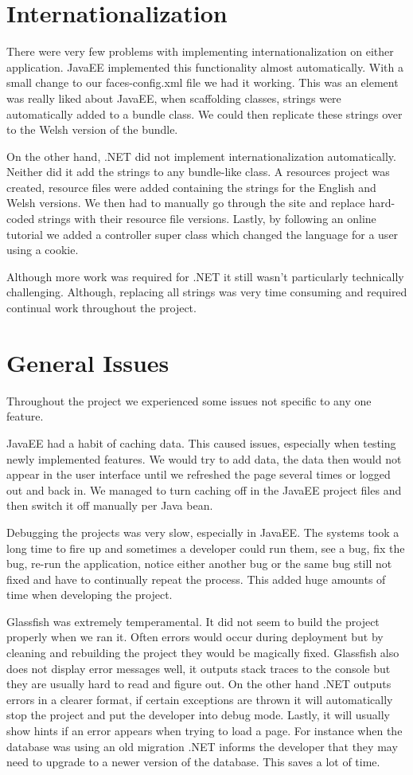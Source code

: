 \section{Internationalization}
There were very few problems with implementing internationalization on either application. JavaEE implemented this functionality almost automatically. With a small change to our faces-config.xml file we had it working. This was an element was really liked about JavaEE, when scaffolding classes, strings were automatically added to a bundle class. We could then replicate these strings over to the Welsh version of the bundle. \par
On the other hand, .NET did not implement internationalization automatically. Neither did it add the strings to any bundle-like class. A resources project was created, resource files were added containing the strings for the English and Welsh versions. We then had to manually go through the site and replace hard-coded strings with their resource file versions. Lastly, by following an online tutorial\cite{mvci18ntutorial} we added a controller super class which changed the language for a user using a cookie. \par
Although more work was required for .NET it still wasn’t particularly technically challenging. Although, replacing all strings was very time consuming and required continual work throughout the project.
\section {General Issues}
Throughout the project we experienced some issues not specific to any one feature. \par
JavaEE had a habit of caching data. This caused issues, especially when testing newly implemented features. We would try to add data, the data then would not appear in the user interface until we refreshed the page several times or logged out and back in. We managed to turn caching off in the JavaEE project files and then switch it off manually per Java bean. \par
Debugging the projects was very slow, especially in JavaEE. The systems took a long time to fire up and sometimes a developer could run them, see a bug, fix the bug, re-run the application, notice either another bug or the same bug still not fixed and have to continually repeat the process. This added huge amounts of time when developing the project. \par
Glassfish was extremely temperamental. It did not seem to build the project properly when we ran it. Often errors would occur during deployment but by cleaning and rebuilding the project they would be magically fixed. Glassfish also does not display error messages well, it outputs stack traces to the console but they are usually hard to read and figure out. On the other hand .NET outputs errors in a clearer format, if certain exceptions are thrown it will automatically stop the project and put the developer into debug mode. Lastly, it will usually show hints if an error appears when trying to load a page. For instance when the database was using an old migration .NET informs the developer that they may need to upgrade to a newer version of the database. This saves a lot of time.

